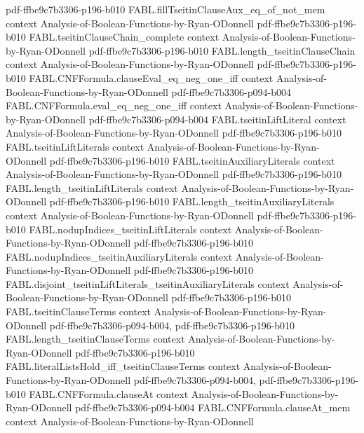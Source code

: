 \begin{theorem}
  {pdf-ffbe9c7b3306-p196-b010}
\proofstep
  {FABL.fillTseitinClauseAux_eq_of_not_mem}
  {context}
  {Analysis-of-Boolean-Functions-by-Ryan-ODonnell}
  {pdf-ffbe9c7b3306-p196-b010}
\proofstep
  {FABL.tseitinClauseChain_complete}
  {context}
  {Analysis-of-Boolean-Functions-by-Ryan-ODonnell}
  {pdf-ffbe9c7b3306-p196-b010}
\proofstep
  {FABL.length_tseitinClauseChain}
  {context}
  {Analysis-of-Boolean-Functions-by-Ryan-ODonnell}
  {pdf-ffbe9c7b3306-p196-b010}
\proofstep
  {FABL.CNFFormula.clauseEval_eq_neg_one_iff}
  {context}
  {Analysis-of-Boolean-Functions-by-Ryan-ODonnell}
  {pdf-ffbe9c7b3306-p094-b004}
\proofstep
  {FABL.CNFFormula.eval_eq_neg_one_iff}
  {context}
  {Analysis-of-Boolean-Functions-by-Ryan-ODonnell}
  {pdf-ffbe9c7b3306-p094-b004}
\proofstep
  {FABL.tseitinLiftLiteral}
  {context}
  {Analysis-of-Boolean-Functions-by-Ryan-ODonnell}
  {pdf-ffbe9c7b3306-p196-b010}
\proofstep
  {FABL.tseitinLiftLiterals}
  {context}
  {Analysis-of-Boolean-Functions-by-Ryan-ODonnell}
  {pdf-ffbe9c7b3306-p196-b010}
\proofstep
  {FABL.tseitinAuxiliaryLiterals}
  {context}
  {Analysis-of-Boolean-Functions-by-Ryan-ODonnell}
  {pdf-ffbe9c7b3306-p196-b010}
\proofstep
  {FABL.length_tseitinLiftLiterals}
  {context}
  {Analysis-of-Boolean-Functions-by-Ryan-ODonnell}
  {pdf-ffbe9c7b3306-p196-b010}
\proofstep
  {FABL.length_tseitinAuxiliaryLiterals}
  {context}
  {Analysis-of-Boolean-Functions-by-Ryan-ODonnell}
  {pdf-ffbe9c7b3306-p196-b010}
\proofstep
  {FABL.nodupIndices_tseitinLiftLiterals}
  {context}
  {Analysis-of-Boolean-Functions-by-Ryan-ODonnell}
  {pdf-ffbe9c7b3306-p196-b010}
\proofstep
  {FABL.nodupIndices_tseitinAuxiliaryLiterals}
  {context}
  {Analysis-of-Boolean-Functions-by-Ryan-ODonnell}
  {pdf-ffbe9c7b3306-p196-b010}
\proofstep
  {FABL.disjoint_tseitinLiftLiterals_tseitinAuxiliaryLiterals}
  {context}
  {Analysis-of-Boolean-Functions-by-Ryan-ODonnell}
  {pdf-ffbe9c7b3306-p196-b010}
\proofstep
  {FABL.tseitinClauseTerms}
  {context}
  {Analysis-of-Boolean-Functions-by-Ryan-ODonnell}
  {pdf-ffbe9c7b3306-p094-b004,
    pdf-ffbe9c7b3306-p196-b010}
\proofstep
  {FABL.length_tseitinClauseTerms}
  {context}
  {Analysis-of-Boolean-Functions-by-Ryan-ODonnell}
  {pdf-ffbe9c7b3306-p196-b010}
\proofstep
  {FABL.literalListsHold_iff_tseitinClauseTerms}
  {context}
  {Analysis-of-Boolean-Functions-by-Ryan-ODonnell}
  {pdf-ffbe9c7b3306-p094-b004,
    pdf-ffbe9c7b3306-p196-b010}
\proofstep
  {FABL.CNFFormula.clauseAt}
  {context}
  {Analysis-of-Boolean-Functions-by-Ryan-ODonnell}
  {pdf-ffbe9c7b3306-p094-b004}
\proofstep
  {FABL.CNFFormula.clauseAt_mem}
  {context}
  {Analysis-of-Boolean-Functions-by-Ryan-ODonnell}

\end{theorem}
